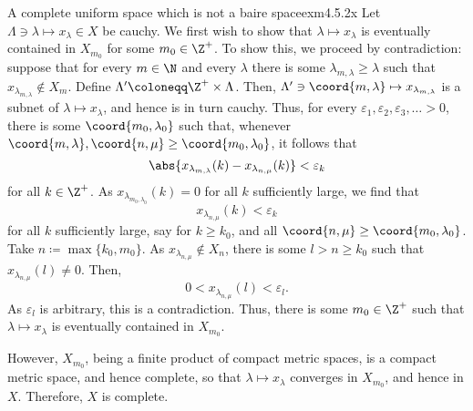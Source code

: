 \begin{exm}{A complete uniform space which is not a baire space}{exm4.5.2x}
Let $\Lambda \ni \lambda \mapsto x_{\lambda}\in X$ be cauchy.  We first wish to show that $\lambda \mapsto x_\lambda$ is eventually contained in $X_{m_0}$ for some $m_0\in \Z ^+$.  To show this, we proceed by contradiction:  suppose that for every $m\in \N$ and every $\lambda$ there is some $\lambda _{m,\lambda}\geq \lambda$ such that $x_{\lambda _{m,\lambda}}\notin X_m$.  Define $\Lambda '\coloneqq \Z ^+\times \Lambda$.  Then, $\Lambda '\ni \coord{m,\lambda}\mapsto x_{\lambda _{m,\lambda}}$ is a subnet of $\lambda \mapsto x_\lambda$, and hence is in turn cauchy.  Thus, for every $\varepsilon _1,\varepsilon _2,\varepsilon _3,\ldots >0$, there is some $\coord{m_0,\lambda _0}$ such that, whenever $\coord{m,\lambda},\coord{n,\mu}\geq \coord{m_0,\lambda _0}$, it follows that
\begin{equation}
\abs{x_{\lambda _{m,\lambda}}(k)-x_{\lambda _{n,\mu}}(k)}<\varepsilon _k
\end{equation}
for all $k\in \Z ^+$.  As $x_{\lambda _{m_0,\lambda _0}}(k)=0$ for all $k$ sufficiently large, we find that
\begin{equation}
x_{\lambda _{n,\mu}}(k)<\varepsilon _k
\end{equation}
for all $k$ sufficiently large, say for $k\geq k_0$, and all $\coord{n,\mu}\geq \coord{m_0,\lambda _0}$.  Take $n\coloneqq \max \{ k_0,m_0\}$.  As $x_{\lambda _{n,\mu}}\notin X_n$, there is some $l>n\geq k_0$ such that $x_{\lambda _{n,\mu}}(l)\neq 0$.  Then,
\begin{equation}
0<x_{\lambda _{n,\mu}}(l)<\varepsilon _l.
\end{equation}
As $\varepsilon _l$ is arbitrary, this is a contradiction.  Thus, there is some $m_0\in \Z ^+$ such that $\lambda \mapsto x_\lambda$ is eventually contained in $X_{m_0}$.

However, $X_{m_0}$, being a finite product of compact metric spaces, is a compact metric space, and hence complete, so that $\lambda \mapsto x_\lambda$ converges in $X_{m_0}$, and hence in $X$.  Therefore, $X$ is complete.


\end{exm}
